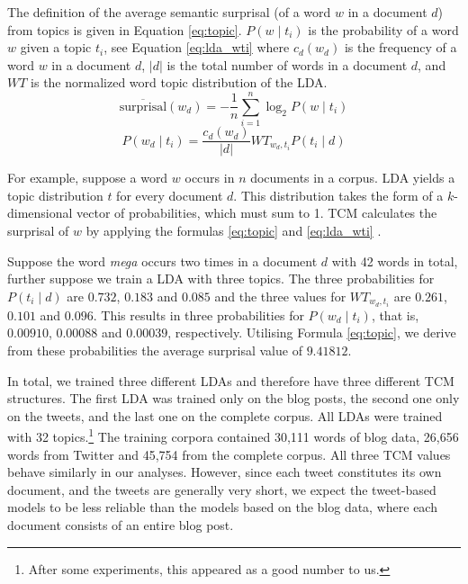 \documentclass[output=paper,colorlinks,citecolor=brown]{langscibook}
\begin{document}
The definition of the average semantic surprisal (of a word $w$ in  a document $d$) from topics is given in Equation \ref{eq:topic}. $ P(w\mid t_i)$ is the probability of a word $w$ given a topic $t_i$, see Equation \ref{eq:lda_wti} where $ c_d(w_d) $ is the frequency of a word $ w $ in a document $ d $, $ |d| $ is the total number of words in a document $d$, and $WT$ is the normalized word topic distribution of the LDA.
\begin{equation}\label{eq:topic}
\overline{\text{surprisal}}(w_d) = -\frac{1}{n} \sum_{i=1}^{n}\log_2 P(w \mid  t_i)
\end{equation}
\begin{equation}\label{eq:lda_wti}
P(w_d \mid  t_i) = \frac{c_d(w_d)}{|d|} WT_{w_d,t_i} P(t_i\mid d)
\end{equation}

For example, suppose a word $w$ occurs in $n$ documents in a corpus.
LDA yields a topic distribution $ t $ for every document $ d $.
This distribution takes the form of a $k$-dimensional vector of probabilities, which must sum to 1.
TCM calculates the surprisal of $w$ by applying the formulas \ref{eq:topic} and \ref{eq:lda_wti} \citep{philipp2022keyword,philipp2023idioms}.

Suppose the word \textit{mega} occurs two times in a document $d$ with 42 words in total, further suppose we train a LDA with three topics. The three probabilities for $ P(t_i\mid d)$ are $0.732$, $0.183$ and $0.085$ and the three values for $WT_{w_d,t_i}$ are $0.261$, $0.101$ and $0.096$. This results in three probabilities for $P(w_d\mid t_i)$, that is, $0.00910$, $0.00088$ and $0.00039$, respectively. Utilising Formula \ref{eq:topic}, we derive from these probabilities the average surprisal value of $9.41812$.

In total, we trained three different LDAs and therefore have three different TCM structures. The first LDA was trained only on the blog posts, the second one only on the tweets, and the last one on the complete corpus. All LDAs were trained with 32 topics.\footnote{After some experiments, this appeared as a good number to us.} 
The training corpora contained 30,111 words of blog data, 26,656 words from Twitter and 45,754 from the complete corpus. All three TCM values behave similarly in our analyses. However, since each tweet constitutes its own document, and the tweets are generally very short, we expect the tweet-based models to be less reliable than the models based on the blog data, where each document consists of an entire blog post. 
\end{document}
